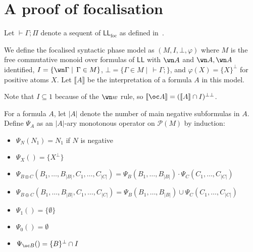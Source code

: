 \documentclass[11pt]{article}
\author{Naïm Favier}
\newcommand\LL{\textsf{LL}}
\newcommand\LLfoc{{\LL_\text{foc}}}
\newcommand\size[1]{{\lvert #1 \rvert}}
\newcommand\sem[1]{{\llbracket #1 \rrbracket}}
\newcommand\biperp{{\perp\perp}}
\begin{document}
\section{A proof of focalisation}

Let $\vdash \Gamma; \Pi$ denote a sequent of $\LLfoc$ as defined in~\cite{laurent}.

We define the focalised syntactic phase model as $(M, I, \bot, \varphi)$ where $M$ is the
free commutative monoid over formulas of $\LL$ with $\wn A$ and $\wn A, \wn A$ identified,
$I = \{\wn \Gamma\mid\,\Gamma\in M\}$, $\bot = \{\Gamma \in M \mid\,\vdash \Gamma;\}$, and $\varphi(X) = \{X\}^\perp$
for positive atoms $X$. Let $\sem{A}$ be the interpretation of a formula $A$ in this model.

Note that $I \subseteq 1$ because of the $\wn w$ rule, so $\sem{\oc A} = (\sem{A} \cap I)^\biperp$.

For a formula $A$, let $\size{A}$ denote the number of main negative subformulas in $A$. Define $\Psi_A$ as an $\size{A}$-ary monotonous operator on $\mathcal P(M)$ by induction:
\begin{itemize}
    \item $\Psi_N(N_1) = N_1$ if $N$ is negative
    \item $\Psi_X() = \{X^\perp\}$
    \item $\Psi_{B \otimes C}(B_1, \dots, B_\size{B}, C_1, \dots, C_\size{C}) = \Psi_B(B_1, \dots, B_\size{B}) \cdot \Psi_C(C_1, \dots, C_\size{C})$
    \item $\Psi_{B \oplus C}(B_1, \dots, B_\size{B}, C_1, \dots, C_\size{C}) = \Psi_B(B_1, \dots, B_\size{B}) \cup \Psi_C(C_1, \dots, C_\size{C})$
    \item $\Psi_1() = \{\emptyset\}$
    \item $\Psi_0() = \emptyset$
    \item $\Psi_{\oc B}() = \{B\}^\perp \cap I$
\end{itemize}
\end{document}

